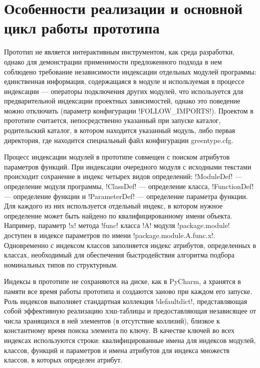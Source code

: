 
\section{Особенности реализации и основной цикл работы прототипа}
\label{sec:prototype-architecture}

Прототип не является интерактивным инструментом, как среда разработки, однако
для демонстрации применимости предложенного подхода в нем соблюдено требование
независимости индексации отдельных модулей программы: единственная информация,
содержащаяся в модуле и используемая в процессе индексации --- операторы
подключения других модулей, что используется для предварительной индексации
проектных зависимостей, однако это поведение можно отключить (параметр
конфигурации !FOLLOW_IMPORTS!). Проектом в
прототипе считается, непосредственно указанный при запуске каталог, родительский
каталог, в котором находится указанный модуль, либо первая директория,
где находится специальный файл конфигурации greentype.cfg.

Процесс индексации модулей в прототипе совмещен с поиском атрибутов параметров
функций. При индексации очередного модуля с исходными текстами происходит
сохранение в индекс четырех видов определений: !ModuleDef! --- определение
модуля программы, !ClassDef! --- определение класса, !FunctionDef! ---
определение функции и !ParameterDef! --- определение параметра функции. Для
каждого из них используется отдельный индекс, в котором нужное определение может
быть найдено по квалифицированному имени объекта. Например, параметр !x! метода
!func! класса !A! модуля !package.module! доступен в индексе параметров по имени
!package.module.A.func.x!. Одновременно с индексом классов
заполняется индекс атрибутов, определенных в классах, необходимый для
обеспечения быстродействия алгоритма подбора номинальных типов по структурным.

Индексы в прототипе не сохраняются на диске, как в PyCharm, а хранятся в
памяти все время работы прототипа и создаются заново при каждом его запуске. Роль
индексов выполняет стандартная коллекция !defaultdict!, представляющая собой
эффективную реализацию хэш-таблицы и предоставляющая независящее от числа
хранящихся в ней элементов (в отсутствие коллизий), близкое к константному
время поиска элемента по ключу. В качестве ключей во всех индексах используются
строки: квалифицированные имена для индексов модулей, классов, функций и
параметров и имена атрибутов для индекса множеств классов, в которых определен
атрибут.

